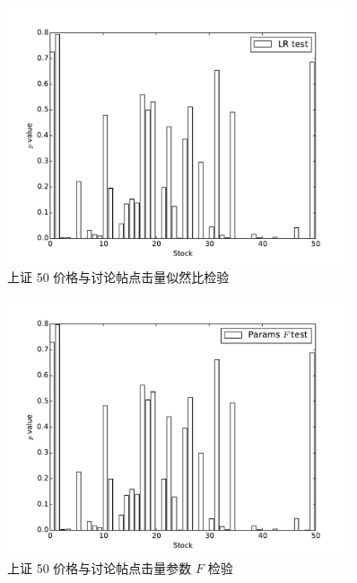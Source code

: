 \begin{figure}
  \centering
  \includegraphics[width=0.9\textwidth]{plots/price_click_count_granger_on_sse_50_lrtest.pdf}
  \caption{上证 50 价格与讨论帖点击量似然比检验}
  \label{price_click_count:3}
\end{figure}

\begin{figure}
  \centering
  \includegraphics[width=0.9\textwidth]{plots/price_click_count_granger_on_sse_50_params_ftest.pdf}
  \caption{上证 50 价格与讨论帖点击量参数 $F$ 检验}
  \label{price_click_count:4}
\end{figure}

